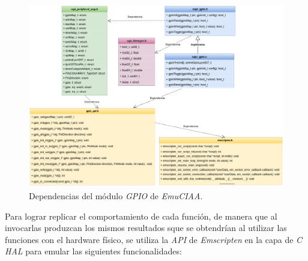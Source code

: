 \begin{figure}[ht]
	\centering
	\includegraphics[scale=.46]{./Figures/DiagramaClasesEmulador.png}
	\caption{Dependencias del módulo \textit{GPIO} de \textit{EmuCIAA}.}
	\label{fig:GPIOEmulador}
\end{figure}

\newpage

Para lograr replicar el comportamiento de cada función, de manera que al invocarlas produzcan los mismos resultados sque se obtendrían al utilizar las funciones con el hardware físico, se utiliza la \textit{API} de \textit{Emscripten} en la capa de \textit{C HAL} para emular las siguientes funcionalidades:

